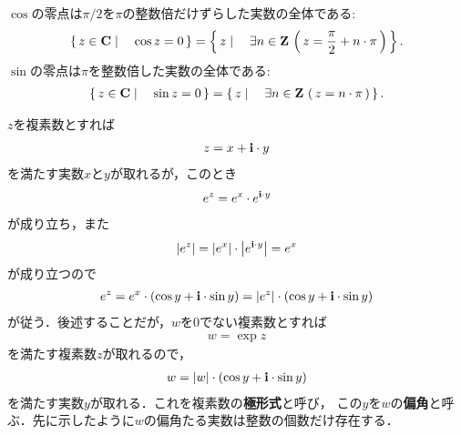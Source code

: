 	\begin{screen}
		\begin{thm}[余弦と正弦の零点]
			$\cos$の零点は$\pi/2$を$\pi$の整数倍だけずらした実数の全体である:
			\begin{align}
				\left\{\, z \in \mathbf{C} \mid \quad \cos{z} = 0\, \right\}
				= \left\{\, z \mid \quad \exists n \in \mathbf{Z}\, \left(\, z = \frac{\pi}{2} + n \cdot \pi\, \right)\, \right\}.
			\end{align}
			$\sin$の零点は$\pi$を整数倍した実数の全体である:
			\begin{align}
				\left\{\, z \in \mathbf{C} \mid \quad \sin{z} = 0\, \right\}
				= \left\{\, z \mid \quad \exists n \in \mathbf{Z}\, \left(\, z = n \cdot \pi\, \right)\, \right\}.
			\end{align}
		\end{thm}
	\end{screen}
	
	$z$を複素数とすれば
	\begin{align}
		z = x + \mathbf{i} \cdot y
	\end{align}
	を満たす実数$x$と$y$が取れるが，このとき
	\begin{align}
		e^z = e^x \cdot e^{\mathbf{i} \cdot y}
	\end{align}
	が成り立ち，また
	\begin{align}
		\left|e^z\right| = \left|e^x\right| \cdot \left|e^{\mathbf{i} \cdot y}\right| = e^x
	\end{align}
	が成り立つので
	\begin{align}
		e^z = e^x \cdot (\cos{y} + \mathbf{i} \cdot \sin{y}) = \left|e^z\right| \cdot (\cos{y} + \mathbf{i} \cdot \sin{y})
	\end{align}
	が従う．後述することだが，$w$を$0$でない複素数とすれば
	\begin{align}
		w = \exp{z}
	\end{align}
	を満たす複素数$z$が取れるので，
	\begin{align}
		w = |w| \cdot (\cos{y} + \mathbf{i} \cdot \sin{y})
	\end{align}
	を満たす実数$y$が取れる．これを複素数の{\bf 極形式}と呼び，
	この$y$を$w$の{\bf 偏角}と呼ぶ．先に示したように$w$の偏角たる実数は整数の個数だけ存在する．